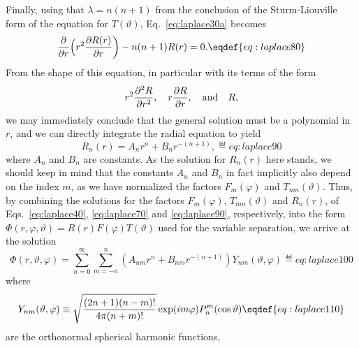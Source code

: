 Finally, using that $\lambda=n(n+1)$ from the conclusion of the Sturm-Liouville
form of the equation for $T(\vartheta)$, Eq.~\eqref{eq:laplace30a} becomes
$$
  {{\partial}\over{\partial r}}
    \Big(r^2{{\partial R(r)}\over{\partial r}}\bigg)-n(n+1)R(r)=0.
  \eqdef{eq:laplace80}
$$
From the shape of this equation, in particular with its terms of the form
$$
  r^2{{\partial^2 R}\over{\partial r^2}},\quad
  r{{\partial R}\over{\partial r}},\quad\hbox{and}\quad R,
$$
we may immediately conclude that the general solution must be a polynomial in
$r$, and we can directly integrate the radial equation to yield
$$
  R_n(r)=A_n r^n + B_n r^{-(n+1)},
  \eqdef{eq:laplace90}
$$
where $A_n$ and $B_n$ are constants. As the solution for $R_n(r)$ here stands,
we should keep in mind that the constants $A_n$ and $B_n$ in fact implicitly
also depend on the index $m$, as we have normalized the factors $F_m(\varphi)$
and $T_{nm}(\vartheta)$. Thus, by combining the solutions for the factors
$F_m(\varphi)$, $T_{mn}(\vartheta)$ and $R_n(r)$, of Eqs.~\eqref{eq:laplace40},
\eqref{eq:laplace70} and \eqref{eq:laplace90}, respectively, into the form
$\Phi(r,\varphi,\vartheta) = R(r)F(\varphi)T(\vartheta)$ used for the variable
separation, we arrive at the solution
$$
  \Phi(r,\vartheta,\varphi) = \sum^{\infty}_{n=0}\sum^{n}_{m=-n}
  (A_{nm} r^n + B_{nm} r^{-(n+1)})Y_{nm}(\vartheta,\varphi)
  \eqdef{eq:laplace100}
$$
where
$$
  Y_{nm}(\vartheta,\varphi)\equiv
  \sqrt{{{(2n+1)(n-m)!}\over{4\pi(n+m)!}}}\exp(im\varphi)P^m_n(\cos\vartheta)
  \eqdef{eq:laplace110}
$$
are the orthonormal spherical harmonic functions,
